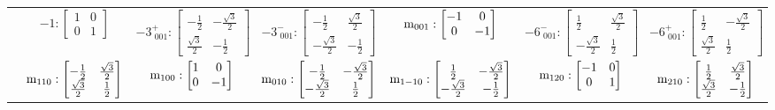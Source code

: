 \documentclass[fleqn,8pt,landscape]{jsarticle}
\begin{document}
\begin{longtable}{ccccccc}
& $ -1:\begin{bmatrix} 1 & 0 \\ 0 & 1 \end{bmatrix} $ & $ -3^{+}_{\,\,001}:\begin{bmatrix} - \frac{1}{2} & - \frac{\sqrt{3}}{2} \\ \frac{\sqrt{3}}{2} & - \frac{1}{2} \end{bmatrix} $ & $ -3^{-}_{\,\,001}:\begin{bmatrix} - \frac{1}{2} & \frac{\sqrt{3}}{2} \\ - \frac{\sqrt{3}}{2} & - \frac{1}{2} \end{bmatrix} $ & $ {\rm m}_{001}:\begin{bmatrix} -1 & 0 \\ 0 & -1 \end{bmatrix} $ & $ -6^{-}_{\,\,001}:\begin{bmatrix} \frac{1}{2} & \frac{\sqrt{3}}{2} \\ - \frac{\sqrt{3}}{2} & \frac{1}{2} \end{bmatrix} $ & $ -6^{+}_{\,\,001}:\begin{bmatrix} \frac{1}{2} & - \frac{\sqrt{3}}{2} \\ \frac{\sqrt{3}}{2} & \frac{1}{2} \end{bmatrix} $ \\
& $ {\rm m}_{110}:\begin{bmatrix} - \frac{1}{2} & \frac{\sqrt{3}}{2} \\ \frac{\sqrt{3}}{2} & \frac{1}{2} \end{bmatrix} $ & $ {\rm m}_{100}:\begin{bmatrix} 1 & 0 \\ 0 & -1 \end{bmatrix} $ & $ {\rm m}_{010}:\begin{bmatrix} - \frac{1}{2} & - \frac{\sqrt{3}}{2} \\ - \frac{\sqrt{3}}{2} & \frac{1}{2} \end{bmatrix} $ & $ {\rm m}_{1-10}:\begin{bmatrix} \frac{1}{2} & - \frac{\sqrt{3}}{2} \\ - \frac{\sqrt{3}}{2} & - \frac{1}{2} \end{bmatrix} $ & $ {\rm m}_{120}:\begin{bmatrix} -1 & 0 \\ 0 & 1 \end{bmatrix} $ & $ {\rm m}_{210}:\begin{bmatrix} \frac{1}{2} & \frac{\sqrt{3}}{2} \\ \frac{\sqrt{3}}{2} & - \frac{1}{2} \end{bmatrix} $ \\ \hline

\end{longtable}
\end{document}
